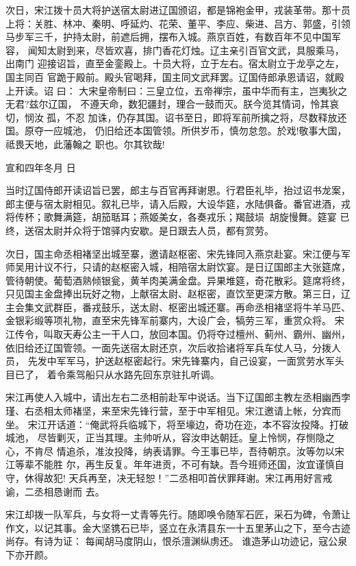 次日，宋江拨十员大将护送宿太尉进辽国颁诏，都是锦袍金甲，戎装革带。那十员
上将：关胜、林冲、秦明、呼延灼、花荣、董平、李应、柴进、吕方、郭盛，引领
马步军三千，护持太尉，前遮后拥，摆布入城。燕京百姓，有数百年不见中国军容，
闻知太尉到来，尽皆欢喜，排门香花灯烛。辽主亲引百官文武，具服乘马，出南门
迎接诏旨，直至金銮殿上。十员大将，立于左右。宿太尉立于龙亭之左，国主同百
官跪于殿前。殿头官喝拜，国主同文武拜罢。辽国侍郎承恩请诏，就殿上开读。诏
曰：
大宋皇帝制曰：三皇立位，五帝禅宗，虽中华而有主，岂夷狄之无君?兹尔辽国，
不遵天命，数犯疆封，理合一鼓而灭。朕今览其情词，怜其哀切，悯汝孤，不忍
加诛，仍存其国。诏书至日，即将军前所擒之将，尽数释放还国。原夺一应城池，
仍旧给还本国管领。所供岁币，慎勿怠忽。於戏!敬事大国，祗畏天地，此藩翰之
职也。尔其钦哉!

宣和四年冬月
日

当时辽国侍郎开读诏旨已罢，郎主与百官再拜谢恩。行君臣礼毕，抬过诏书龙案，
郎主便与宿太尉相见。叙礼已毕，请入后殿，大设华筵，水陆俱备。番官进酒，戎
将传杯；歌舞满筵，胡笳聒耳；燕姬美女，各奏戎乐；羯鼓埙，胡旋慢舞。筵宴
已终，送宿太尉并众将于馆驿内安歇。是日跟去人员，都有赏劳。

次日，国主命丞相褚坚出城至寨，邀请赵枢密、宋先锋同入燕京赴宴。宋江便与军
师吴用计议不行，只请的赵枢密入城，相陪宿太尉饮宴。是日辽国郎主大张筵席，
管待朝使。葡萄酒熟倾银瓮，黄羊肉美满金盘。异果堆筵，奇花散彩。筵席将终，
只见国主金盘捧出玩好之物，上献宿太尉、赵枢密，直饮至更深方散。第三日，辽
主会集文武群臣，番戎鼓乐，送太尉、枢密出城还寨。再命丞相褚坚将牛羊马匹、
金银彩缎等项礼物，直至宋先锋军前寨内，大设广会，犒劳三军，重赏众将。
宋江传令，叫取天寿公主一干人口，放回本国。仍将夺过檀州、蓟州、霸州、幽州，
依旧给还辽国管领。一面先送宿太尉还京，次后收拾诸将军兵车仗人马，分拨人员，
先发中军军马，护送赵枢密起行。宋先锋寨内，自己设宴，一面赏劳水军头目已了，
着令乘驾船只从水路先回东京驻扎听调。

宋江再使人入城中，请出左右二丞相前赴军中说话。当下辽国郎主教左丞相幽西孛
瑾、右丞相太师褚坚，来至宋先锋行营，至于中军相见。宋江邀请上帐，分宾而坐。
宋江开话道：“俺武将兵临城下，将至壕边，奇功在迩，本不容汝投降。打破城池，
尽皆剿灭，正当其理。主帅听从，容汝申达朝廷。皇上怜悯，存恻隐之心，不肯尽
情追杀，准汝投降，纳表请罪。今王事已毕，吾待朝京。汝等勿以宋江等辈不能胜
尔，再生反复。年年进贡，不可有缺。吾今班师还国，汝宜谨慎自守，休得故犯!
天兵再至，决无轻恕！”二丞相叩首伏罪拜谢。宋江再用好言戒谕，二丞相恳谢而
去。

宋江却拨一队军兵，与女将一丈青等先行。随即唤令随军石匠，采石为碑，令萧让
作文，以记其事。金大坚镌石已毕，竖立在永清县东一十五里茅山之下，至今古迹
尚存。有诗为证：
每闻胡马度阴山，恨杀澶渊纵虏还。
谁造茅山功迹记，寇公泉下亦开颜。

